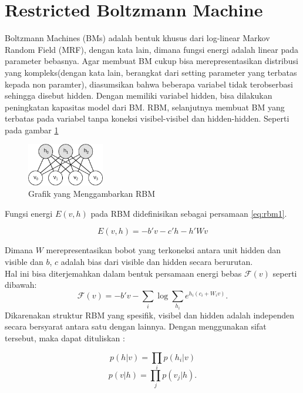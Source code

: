 \section{Restricted Boltzmann Machine}
Boltzmann Machines (BMs) adalah bentuk khusus dari log-linear Markov Random Field (MRF), dengan kata lain, dimana fungsi energi adalah linear pada parameter bebasnya. Agar membuat BM cukup bisa merepresentasikan distribusi yang kompleks(dengan kata lain, berangkat dari setting parameter yang terbatas kepada non paramter), diasumsikan bahwa beberapa variabel tidak terobserbasi sehingga disebut hidden. Dengan memiliki variabel hidden, bisa dilakukan peningkatan kapasitas model dari BM. RBM, selanjutnya membuat BM yang terbatas pada variabel tanpa koneksi visibel-visibel dan hidden-hidden. Seperti pada gambar \ref{fig:rbm} \citep{hinton2006fast}\\
\begin{figure}
	\centering
	\includegraphics[width=0.3\textwidth]
		{pics/rbm.png}
	\caption{Grafik yang Menggambarkan RBM}
	\label{fig:rbm}
\end{figure}

Fungsi energi $E(v,h)$ pada RBM didefinisikan sebagai persamaan \ref{eq:rbm1}.

\begin{equation}
E(v,h) = - b'v - c'h - h'Wv
\label{eq:rbm1}
\end{equation}

Dimana $W$ merepresentasikan bobot yang terkoneksi antara unit hidden dan visible dan $b$, $c$ adalah bias dari visible dan hidden secara berurutan.\\

Hal ini bisa diterjemahkan dalam bentuk persamaan energi bebas $\mathcal{F}(v)$ seperti dibawah:
\[\mathcal{F}(v)= - b'v - \sum_i \log \sum_{h_i} e^{h_i (c_i + W_i v)}.\]
Dikarenakan struktur RBM yang spesifik, visibel dan hidden adalah independen secara bersyarat antara satu dengan lainnya. Dengan menggunakan sifat tersebut, maka dapat dituliskan :

\[p(h|v) = \prod_i p(h_i|v)\]
\[p(v|h) = \prod_j p(v_j|h).\]

